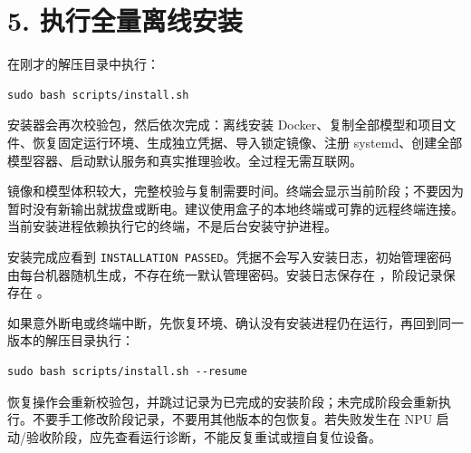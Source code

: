 \documentclass[UTF8,a4paper,zihao=-4,fontset=windows]{ctexart}
\begin{document}
\section*{5. 执行全量离线安装}
在刚才的解压目录中执行：\par
\par\noindent\begin{minipage}{\linewidth}\begin{lstlisting}
sudo bash scripts/install.sh
\end{lstlisting}\end{minipage}\par
安装器会再次校验包，然后依次完成：离线安装 Docker、复制全部模型和项目文件、恢复固定运行环境、生成独立凭据、导入锁定镜像、注册 systemd、创建全部模型容器、启动默认服务和真实推理验收。全过程无需互联网。\par
镜像和模型体积较大，完整校验与复制需要时间。终端会显示当前阶段；不要因为暂时没有新输出就拔盘或断电。建议使用盒子的本地终端或可靠的远程终端连接。当前安装进程依赖执行它的终端，不是后台安装守护进程。\par
安装完成应看到 \texttt{INSTALLATION PASSED}。凭据不会写入安装日志，初始管理密码由每台机器随机生成，不存在统一默认管理密码。安装日志保存在 ，阶段记录保存在 。\par
如果意外断电或终端中断，先恢复环境、确认没有安装进程仍在运行，再回到同一版本的解压目录执行：\par
\par\noindent\begin{minipage}{\linewidth}\begin{lstlisting}
sudo bash scripts/install.sh --resume
\end{lstlisting}\end{minipage}\par
恢复操作会重新校验包，并跳过记录为已完成的安装阶段；未完成阶段会重新执行。不要手工修改阶段记录，不要用其他版本的包恢复。若失败发生在 NPU 启动/验收阶段，应先查看运行诊断，不能反复重试或擅自复位设备。\par
\end{document}
